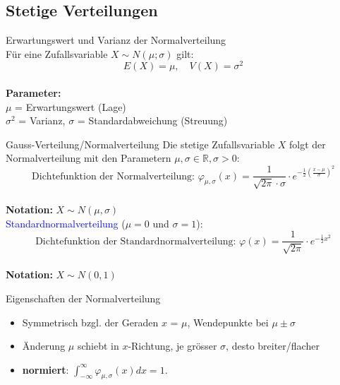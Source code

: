 \subsection{Stetige Verteilungen}

\begin{concept}{Erwartungswert und Varianz der Normalverteilung}\\
Für eine Zufallsvariable $X \sim N(\mu;\sigma)$ gilt:
\vspace{-2mm}\\
$$
E(X) = \mu, \quad V(X) = \sigma^2
$$
\vspace{-7mm}\\
\textbf{Parameter:}\\
$\mu$ = Erwartungswert (Lage)\\
$\sigma^2$ = Varianz, $\sigma$ = Standardabweichung (Streuung)
\end{concept}

\begin{definition}{Gauss-Verteilung/Normalverteilung}
Die stetige Zufallsvariable $X$ folgt der Normalverteilung mit den Parametern $\mu, \sigma \in \mathbb{R}, \sigma>0$:
\vspace{-2mm}\\
$$
\text{Dichtefunktion der Normalverteilung: }\varphi_{\mu,\sigma}(x)=\frac{1}{\sqrt{2\pi} \cdot \sigma} \cdot e^{-\frac{1}{2}(\frac{x-\mu}{\sigma})^2}
$$
\vspace{-5mm}\\
\textbf{Notation:} $X \sim N(\mu,\sigma)$
\vspace{2mm}\\
\textcolor{blue}{Standardnormalverteilung} ($\mu=0$ und $\sigma=1$):
\vspace{-3mm}\\
$$
\text{Dichtefunktion der Standardnormalverteilung: }\varphi(x)=\frac{1}{\sqrt{2\pi}} \cdot e^{-\frac{1}{2}x^2}
$$
\vspace{-5mm}\\
\textbf{Notation:} $X \sim N(0,1)$
\end{definition}

\begin{theorem}{Eigenschaften der Normalverteilung}
    \begin{itemize}
        \item Symmetrisch bzgl. der Geraden $x$ = $\mu$, Wendepunkte bei $\mu \pm \sigma$
        \item Änderung $\mu$ schiebt in $x$-Richtung,
        je grösser $\sigma$, desto breiter/flacher
        \item \textbf{normiert}: $\int_{-\infty}^{\infty} \varphi_{\mu,\sigma}(x)dx = 1$.
    \end{itemize}
\end{theorem}

